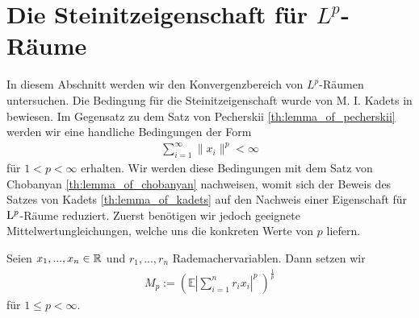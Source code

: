 \section{Die Steinitzeigenschaft für $ L^p $-Räume}
In diesem Abschnitt werden wir den Konvergenzbereich von $ L^p $-Räumen untersuchen.
Die Bedingung für die Steinitzeigenschaft wurde von M. I. Kadets in \cite{Kadets1954}
bewiesen. 
Im Gegensatz zu dem Satz von Pecherskii \ref{th:lemma_of_pecherskii} werden wir eine handliche Bedingungen der Form 
\begin{align*}
	\sum \limits_{i = 1}^\infty \| x_i \|^p < \infty
\end{align*}
für $ 1 < p < \infty $ erhalten.
Wir werden diese Bedingungen mit dem Satz von Chobanyan \ref{th:lemma_of_chobanyan} nachweisen, womit sich der Beweis des Satzes von Kadets \ref{th:lemma_of_kadets} auf den Nachweis einer Eigenschaft für $ \mathrm{L}^p $-Räume reduziert.
Zuerst benötigen wir jedoch geeignete Mittelwertungleichungen, welche uns die konkreten Werte von $ p $ liefern.


\begin{df}
	Seien $ x_1,..., x_n  \in \mathbb{R}$ und $ r_1,...,r_n$ Rademachervariablen.
	Dann setzen wir 
	\begin{align*}
		M_p 
		:=
		\left(
		\mathbb{E}
		\left|
		\sum \limits_{i = 1}^n r_i x_i 
		\right|^p \
		\right)^{\frac{1}{p}}
	\end{align*}
	für $ 1 \leq p < \infty $.
\end{df}

